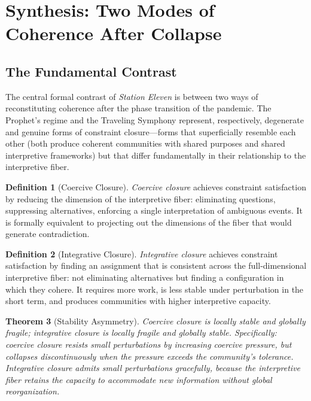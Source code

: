 \documentclass[12pt, oneside]{article}
\theoremstyle{plain}
\newtheorem{theorem}{Theorem}[section]
\theoremstyle{definition}
\newtheorem{definition}[theorem]{Definition}
\theoremstyle{remark}
\begin{document}
\section{Synthesis: Two Modes of Coherence After Collapse}

\subsection{The Fundamental Contrast}

The central formal contrast of \textit{Station Eleven} is between
two ways of reconstituting coherence after the phase transition of
the pandemic. The Prophet's regime and the Traveling Symphony
represent, respectively, degenerate and genuine forms of constraint
closure---forms that superficially resemble each other (both produce
coherent communities with shared purposes and shared interpretive
frameworks) but that differ fundamentally in their relationship to
the interpretive fiber.

\begin{definition}[Coercive Closure]
\emph{Coercive closure} achieves constraint satisfaction by reducing
the dimension of the interpretive fiber: eliminating questions,
suppressing alternatives, enforcing a single interpretation of
ambiguous events. It is formally equivalent to projecting out the
dimensions of the fiber that would generate contradiction.
\end{definition}

\begin{definition}[Integrative Closure]
\emph{Integrative closure} achieves constraint satisfaction by
finding an assignment that is consistent across the full-dimensional
interpretive fiber: not eliminating alternatives but finding a
configuration in which they cohere. It requires more work, is
less stable under perturbation in the short term, and produces
communities with higher interpretive capacity.
\end{definition}

\begin{theorem}[Stability Asymmetry]
\label{thm:stability}
Coercive closure is locally stable and globally fragile; integrative
closure is locally fragile and globally stable. Specifically:
coercive closure resists small perturbations by increasing
coercive pressure, but collapses discontinuously when the pressure
exceeds the community's tolerance. Integrative closure admits small
perturbations gracefully, because the interpretive fiber retains
the capacity to accommodate new information without global
reorganization.
\end{theorem}
\end{document}
